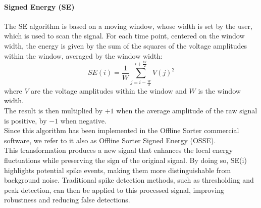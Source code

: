 \paragraph{Signed Energy (SE)}
The SE algorithm is based on a moving window, whose width is set by the user,
which is used to scan the signal. For each time point, centered on the window width,
the energy is given by the sum of the squares of the voltage amplitudes within the
window, averaged by the window width:
\begin{equation*}
    SE(i)=\frac{1}{W}\sum_{j=i-\frac{W}{2}}^{i+\frac{W}{2}}V(j)^2
\end{equation*}
where \(V\) are the voltage amplitudes within the window and \(W\) is the window width.\\
The result is then multiplied by \(+1\) when the average amplitude of the raw signal is positive,
by \(-1\) when negative.\\
Since this algorithm has been implemented in the Offline Sorter commercial software,
we refer to it also as Offline Sorter Signed Energy (OSSE). \\
This transformation produces a new signal that enhances the local energy fluctuations while preserving the sign of the original signal. By doing so, SE(i) highlights potential spike events, making them more distinguishable from background noise. Traditional spike detection methods, such as thresholding and peak detection, can then be applied to this processed signal, improving robustness and reducing false detections.
